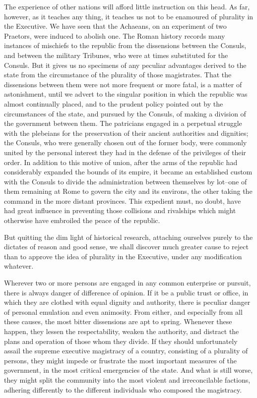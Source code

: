 The experience of other nations will afford little instruction on this head. 
As far, however, as it teaches any thing, it teaches us not to be enamoured of plurality in the Executive. 
We have seen that the Achaeans, on an experiment of two Praetors, were induced to abolish one. 
The Roman history records many instances of mischiefs to the republic from the dissensions between the Consuls, and between the military Tribunes, who were at times substituted for the Consuls. 
But it gives us no specimens of any peculiar advantages derived to the state from the circumstance of the plurality of those magistrates. 
That the dissensions between them were not more frequent or more fatal, is a matter of astonishment, until we advert to the singular position in which the republic was almost continually placed, and to the prudent policy pointed out by the circumstances of the state, and pursued by the Consuls, of making a division of the government between them. 
The patricians engaged in a perpetual struggle with the plebeians for the preservation of their ancient authorities and dignities; the Consuls, who were generally chosen out of the former body, were commonly united by the personal interest they had in the defense of the privileges of their order. 
In addition to this motive of union, after the arms of the republic had considerably expanded the bounds of its empire, it became an established custom with the Consuls to divide the administration between themselves by lot--one of them remaining at Rome to govern the city and its environs, the other taking the command in the more distant provinces. 
This expedient must, no doubt, have had great influence in preventing those collisions and rivalships which might otherwise have embroiled the peace of the republic.

But quitting the dim light of historical research, attaching ourselves purely to the dictates of reason and good sense, we shall discover much greater cause to reject than to approve the idea of plurality in the Executive, under any modification whatever.

Wherever two or more persons are engaged in any common enterprise or pursuit, there is always danger of difference of opinion. 
If it be a public trust or office, in which they are clothed with equal dignity and authority, there is peculiar danger of personal emulation and even animosity. 
From either, and especially from all these causes, the most bitter dissensions are apt to spring. 
Whenever these happen, they lessen the respectability, weaken the authority, and distract the plans and operation of those whom they divide. 
If they should unfortunately assail the supreme executive magistracy of a country, consisting of a plurality of persons, they might impede or frustrate the most important measures of the government, in the most critical emergencies of the state. 
And what is still worse, they might split the community into the most violent and irreconcilable factions, adhering differently to the different individuals who composed the magistracy.

